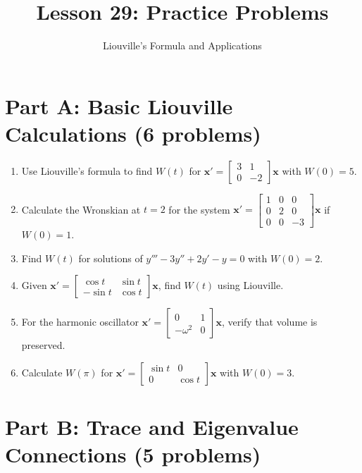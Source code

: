 \documentclass[12pt]{article}
\title{Lesson 29: Practice Problems}
\author{Liouville's Formula and Applications}
\date{}
\begin{document}
\maketitle

\section*{Part A: Basic Liouville Calculations (6 problems)}

\begin{enumerate}
\item Use Liouville's formula to find $W(t)$ for $\mathbf{x}' = \begin{bmatrix} 3 & 1 \\ 0 & -2 \end{bmatrix}\mathbf{x}$ with $W(0) = 5$.

\item Calculate the Wronskian at $t = 2$ for the system $\mathbf{x}' = \begin{bmatrix} 1 & 0 & 0 \\ 0 & 2 & 0 \\ 0 & 0 & -3 \end{bmatrix}\mathbf{x}$ if $W(0) = 1$.

\item Find $W(t)$ for solutions of $y''' - 3y'' + 2y' - y = 0$ with $W(0) = 2$.

\item Given $\mathbf{x}' = \begin{bmatrix} \cos t & \sin t \\ -\sin t & \cos t \end{bmatrix}\mathbf{x}$, find $W(t)$ using Liouville.

\item For the harmonic oscillator $\mathbf{x}' = \begin{bmatrix} 0 & 1 \\ -\omega^{2} & 0 \end{bmatrix}\mathbf{x}$, verify that volume is preserved.

\item Calculate $W(\pi)$ for $\mathbf{x}' = \begin{bmatrix} \sin t & 0 \\ 0 & \cos t \end{bmatrix}\mathbf{x}$ with $W(0) = 3$.
\end{enumerate}

\section*{Part B: Trace and Eigenvalue Connections (5 problems)}
\end{document}
